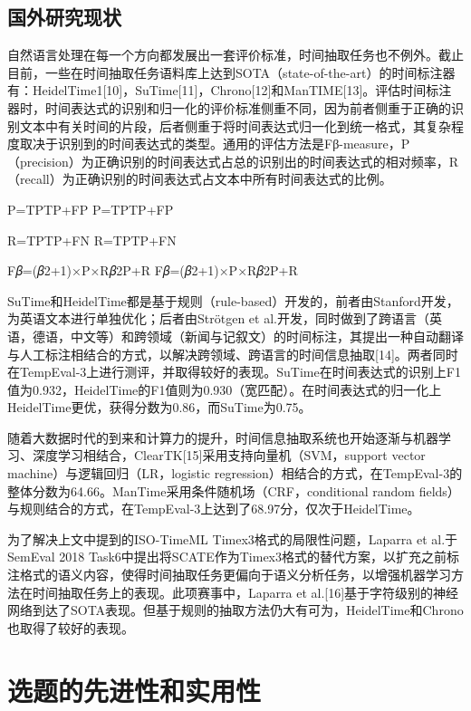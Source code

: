 \subsection{国外研究现状}

自然语言处理在每一个方向都发展出一套评价标准，时间抽取任务也不例外。截止目前，一些在时间抽取任务语料库上达到SOTA（state-of-the-art）的时间标注器有：HeidelTime1[10]，SuTime[11]，Chrono[12]和ManTIME[13]。评估时间标注器时，时间表达式的识别和归一化的评价标准侧重不同，因为前者侧重于正确的识别文本中有关时间的片段，后者侧重于将时间表达式归一化到统一格式，其复杂程度取决于识别到的时间表达式的类型。通用的评估方法是Fβ-measure，P（precision）为正确识别的时间表达式占总的识别出的时间表达式的相对频率，R（recall）为正确识别的时间表达式占文本中所有时间表达式的比例。

P=TPTP+FP
P=TPTP+FP


R=TPTP+FN
R=TPTP+FN

F𝛽=(𝛽2+1)×P×R𝛽2P+R
F𝛽=(𝛽2+1)×P×R𝛽2P+R


SuTime和HeidelTime都是基于规则（rule-based）开发的，前者由Stanford开发，为英语文本进行单独优化；后者由Strötgen et al.开发，同时做到了跨语言（英语，德语，中文等）和跨领域（新闻与记叙文）的时间标注，其提出一种自动翻译与人工标注相结合的方式，以解决跨领域、跨语言的时间信息抽取[14]。两者同时在TempEval-3上进行测评，并取得较好的表现。SuTime在时间表达式的识别上F1值为0.932，HeidelTime的F1值则为0.930（宽匹配）。在时间表达式的归一化上HeidelTime更优，获得分数为0.86，而SuTime为0.75。

随着大数据时代的到来和计算力的提升，时间信息抽取系统也开始逐渐与机器学习、深度学习相结合，ClearTK[15]采用支持向量机（SVM，support vector machine）与逻辑回归（LR，logistic regression）相结合的方式，在TempEval-3的整体分数为64.66。ManTime采用条件随机场（CRF，conditional random fields）与规则结合的方式，在TempEval-3上达到了68.97分，仅次于HeidelTime。

为了解决上文中提到的ISO-TimeML Timex3格式的局限性问题，Laparra et al.于SemEval 2018 Task6中提出将SCATE作为Timex3格式的替代方案，以扩充之前标注格式的语义内容，使得时间抽取任务更偏向于语义分析任务，以增强机器学习方法在时间抽取任务上的表现。此项赛事中，Laparra et al.[16]基于字符级别的神经网络到达了SOTA表现。但基于规则的抽取方法仍大有可为，HeidelTime和Chrono也取得了较好的表现。

\section{选题的先进性和实用性}

